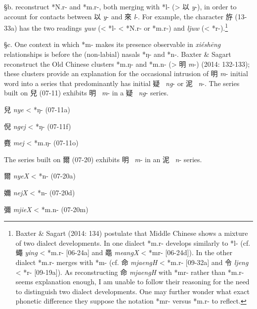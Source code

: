 §b. \citet[122, 133-134]{Baxter2014OldChinese}
reconstruct *N.r- and *m.r-,
both merging with *l- (\textgreater{} 以  \emph{y}-), in order to account
for contacts between 以  \emph{y}- and 來  \emph{l}-. For example, the
character 斿 (13-33a) has the two readings  \emph{yuw} (\textless{} *l-
\textless{} *N.r- or *m.r-) and \emph{ljuw} (\textless{} *r-).\footnote{Baxter
  \& Sagart (2014: 134) postulate that Middle Chinese shows a mixture of
  two dialect developments. In one dialect *m.r- develops similarly to
  *l- (cf. 蠅  \emph{ying} \textless{} *m.r- {[}06-24a] and 黽
   \emph{meangX} \textless{} *m{}r- {[}06-24d]). In the other dialect
  *m.r- merges with *m- (cf. 命  \emph{mjaengH} \textless{} *m.r-
  {[}09-32a] and 令  \emph{ljeng} \textless{} *r- {[}09-19a]). As
  reconstructing 命  \emph{mjaengH} with *mr- rather than *m.r- seems
  explanation enough, I am unable to follow their reasoning for the need
  to distinguish two dialect developments. One may further wonder what
  exact phonetic difference they suppose the notation *mr- versus *m.r-
  to reflect. }

§c. One context in which *m- makes its presence observable in
 \emph{xiéshēng} relationships is before the (non-labial) nasals *ŋ- and
*n-. Baxter \& Sagart reconstruct the Old Chinese clusters *m.ŋ- and
*m.n- (\textgreater{} 明 \emph{m}-) (2014: 132-133); these clusters
provide an ex­pla­na­tion for the occasional intrusion of 明
 \emph{m}-\emph{ }initial word into a series that predominantly has
initial 疑~ \emph{ng}- or 泥~ \emph{n}-. The series built on 兒 (07-11)
exhibits 明~ \emph{m}- in a 疑~ \emph{ng}- series.

\begin{description} \item
兒 \emph{nye} \textless{} *ŋ- (07-11a)
\item
倪 \emph{ngej} \textless{} *ŋ{}- (07-11f)
\item
麑 \emph{mej} \textless{} *m.ŋ{}- (07-11o)
\end{description}

The series built on 爾 (07-20) exhibits 明~ \emph{m}- in an 泥~ \emph{n}-
series.

\begin{description} \item
爾 \emph{nyeX} \textless{} *n- (07-20a)
\item
嬭 \emph{nejX} \textless{} *n{}- (07-20d)
\item
彌 \emph{mjieX} \textless{} *m.n- (07-20m)
\end{description}

